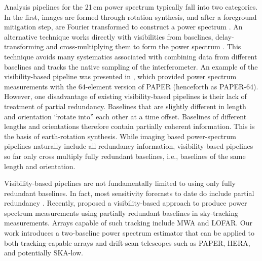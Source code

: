 \documentclass[twocolumn,apj,numberedappendix]{emulateapj}
\renewcommand\[{\begin{equation}}
\renewcommand\]{\end{equation}}
\begin{document}
Analysis pipelines for the 21\,cm power spectrum typically fall into two categories. In the first, images are formed through rotation synthesis, and after a foreground mitigation step, are Fourier transformed to construct a power spectrum \citep{MWAresult0, MWAresult1, LOFARresult}. An alternative technique works directly with visibilities from baselines, delay-transforming and cross-multiplying them to form the power spectrum \citep{delay-transform}. This technique avoids many systematics associated with combining data from different baselines and tracks the native sampling of the interferometer. An example of the visibility-based pipeline was presented in \cite{Ali2015}, which provided power spectrum
measurements with the 64-element version of PAPER (henceforth as PAPER-64). However, one disadvantage of existing visibility-based pipelines is their lack of treatment of partial redundancy. Baselines that are slightly different in length and orientation
``rotate into'' each other at a time offset. Baselines of different lengths and orientations therefore contain partially coherent information. This is the basis of earth-rotation synthesis. While imaging based power-spectrum pipelines naturally include all redundancy information, visibility-based pipelines so far only cross multiply fully redundant baselines, i.e., baselines of the same length and orientation.

Visibility-based pipelines are not fundamentally limited to using only fully redundant baselines. In fact, most sensitivity forecasts to date do include partial redundancy \citep{Pobersens, HERA, JoshAntPos}. Recently, \cite{wterm} proposed a visibility-based approach to produce power spectrum measurements using partially redundant baselines in sky-tracking measurements. Arrays capable of such tracking include MWA and LOFAR. Our work introduces a two-baseline power spectrum estimator that can be applied to both tracking-capable arrays and drift-scan telescopes such as PAPER, HERA, and potentially SKA-low.
\end{document}
